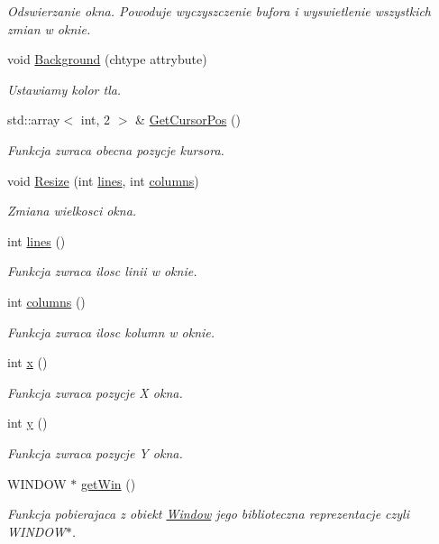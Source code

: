 \begin{DoxyCompactItemize}
\begin{DoxyCompactList}\small\item\em Odswierzanie okna. Powoduje wyczyszczenie bufora i wyswietlenie wszystkich zmian w oknie. \end{DoxyCompactList}\item 
void \hyperlink{class_window_a1e0071ce6dc928eaaa1fa6d0c777583a}{Background} (chtype attrybute)
\begin{DoxyCompactList}\small\item\em Ustawiamy kolor tla. \end{DoxyCompactList}\item 
std\+::array$<$ int, 2 $>$ \& \hyperlink{class_window_a0c9cc2ff9b09f68dd0071ec2d989f957}{Get\+Cursor\+Pos} ()
\begin{DoxyCompactList}\small\item\em Funkcja zwraca obecna pozycje kursora. \end{DoxyCompactList}\item 
void \hyperlink{class_window_af895612c78b06c729eb19428cd323483}{Resize} (int \hyperlink{class_window_a2d89f391164858a8e53d301f247873dd}{lines}, int \hyperlink{class_window_a9df6358fb547f10baa070fc811995ba7}{columns})
\begin{DoxyCompactList}\small\item\em Zmiana wielkosci okna. \end{DoxyCompactList}\item 
int \hyperlink{class_window_a2d89f391164858a8e53d301f247873dd}{lines} ()
\begin{DoxyCompactList}\small\item\em Funkcja zwraca ilosc linii w oknie. \end{DoxyCompactList}\item 
int \hyperlink{class_window_a9df6358fb547f10baa070fc811995ba7}{columns} ()
\begin{DoxyCompactList}\small\item\em Funkcja zwraca ilosc kolumn w oknie. \end{DoxyCompactList}\item 
int \hyperlink{class_window_a6e6b474e441e3a9334aa0c4f36687a81}{x} ()
\begin{DoxyCompactList}\small\item\em Funkcja zwraca pozycje X okna. \end{DoxyCompactList}\item 
int \hyperlink{class_window_a8049228817b0e699f35f46dcd6166db5}{y} ()
\begin{DoxyCompactList}\small\item\em Funkcja zwraca pozycje Y okna. \end{DoxyCompactList}\item 
W\+I\+N\+D\+O\+W $\ast$ \hyperlink{class_window_a17c622ebd30f9fe06c643d235e64c545}{get\+Win} ()
\begin{DoxyCompactList}\small\item\em Funkcja pobierajaca z obiekt \hyperlink{class_window}{Window} jego biblioteczna reprezentacje czyli W\+I\+N\+D\+O\+W$\ast$. \end{DoxyCompactList}\end{DoxyCompactItemize}
